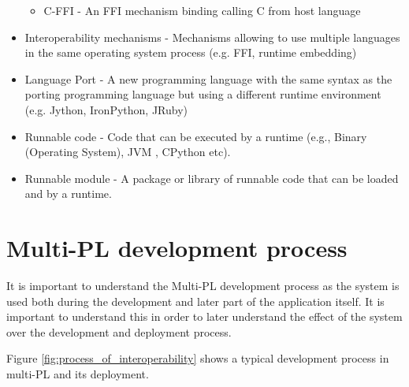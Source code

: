 \documentclass[sigplan,10pt,manuscript,nonacm]{acmart}
\begin{document}
\begin{itemize}
\begin{itemize}
        \vspace{-2mm}\item C-FFI - An FFI mechanism binding calling C from host language
    \end{itemize}
    \vspace{-2mm}\item Interoperability mechanisms - Mechanisms allowing to use multiple languages in the same operating system process (e.g. FFI, runtime embedding)
    \vspace{-2mm}\item Language Port - A new programming language with the same syntax as the porting programming language but using a different runtime environment (e.g. Jython\cite{jython}, IronPython\cite{ironpython}, JRuby\cite{jruby})
    \vspace{-2mm}\item Runnable code - Code that can be executed by a runtime (e.g., Binary (Operating System), JVM \cite{jvm_specs}, CPython \cite{cpython} etc).
    \vspace{-2mm}\item Runnable module - A package or library of runnable code that can be loaded and by a runtime.
\end{itemize}


\section{Multi-PL development process}

It is important to understand the Multi-PL development process as the system is used both during the development and later part of the application itself. It is important to understand this in order to later understand the effect of the system over the development and deployment process.

Figure \ref{fig:process_of_interoperability} shows a typical development process in multi-PL and its deployment.
\end{document}
